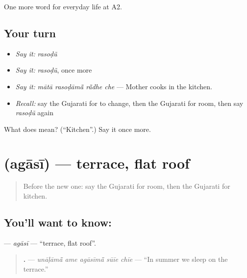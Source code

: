 \begin{grammarlens}[title={What you've built}]
One more word for everyday life at A2.
\end{grammarlens}

\subsection*{Your turn}
\begin{itemize}
\raggedright
  \item \emph{Say it:} \emph{rasoḍũ}
  \item \emph{Say it:} \emph{rasoḍũ}, once more
  \item \emph{Say it:} \emph{mātā rasoḍāmā̃ rā̃dhe che} — Mother cooks in the kitchen.
  \item \emph{Recall:} say the Gujarati for to change, then the Gujarati for room, then say \emph{rasoḍũ} again
\end{itemize}

\begin{tcolorbox}[breakable,colback=teal!4,colframe=teal!35!black,title={Before you move on}]
What does  mean? (\textquotedblleft{}Kitchen\textquotedblright{}.) Say it once more.
\end{tcolorbox}
\section[\texorpdfstring{\gu{અગાસી} (agāsī)}{અગાસી (agāsī)}]{ (agāsī) — terrace, flat roof}

\label{lesson:GU-C153-agasi}



\begin{quote}
Before the new one: say the Gujarati for room, then the Gujarati for kitchen.
\end{quote}

\subsection*{You'll want to know: }
\textbf{} — \emph{agāsī} — \textquotedblleft{}terrace, flat roof\textquotedblright{}.

\begin{quote}
\textbf{    .} — \emph{unāḷāmā̃ ame agāsīmā̃ sūīe chīe} — \textquotedblleft{}In summer we sleep on the terrace.\textquotedblright{}
\end{quote}

